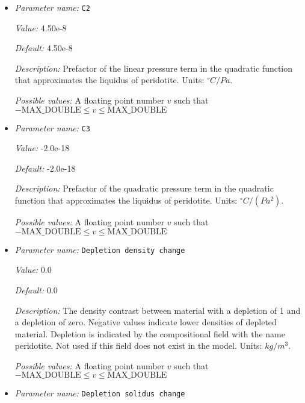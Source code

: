 \begin{itemize}
{\it Possible values:} A floating point number $v$ such that $-\text{MAX\_DOUBLE} \leq v \leq \text{MAX\_DOUBLE}$
\item {\it Parameter name:} {\tt C2}
\label{parameters:Material model/Melt simple/C2}
\label{parameters:Material_20model/Melt_20simple/C2}


{\it Value:} 4.50e-8


{\it Default:} 4.50e-8


{\it Description:} Prefactor of the linear pressure term in the quadratic function that approximates the liquidus of peridotite. Units: ${}^\circ C/Pa$.


{\it Possible values:} A floating point number $v$ such that $-\text{MAX\_DOUBLE} \leq v \leq \text{MAX\_DOUBLE}$
\item {\it Parameter name:} {\tt C3}
\label{parameters:Material model/Melt simple/C3}
\label{parameters:Material_20model/Melt_20simple/C3}


{\it Value:} -2.0e-18


{\it Default:} -2.0e-18


{\it Description:} Prefactor of the quadratic pressure term in the quadratic function that approximates the liquidus of peridotite. Units: ${}^\circ C/(Pa^2)$.


{\it Possible values:} A floating point number $v$ such that $-\text{MAX\_DOUBLE} \leq v \leq \text{MAX\_DOUBLE}$
\item {\it Parameter name:} {\tt Depletion density change}
\label{parameters:Material model/Melt simple/Depletion density change}
\label{parameters:Material_20model/Melt_20simple/Depletion_20density_20change}


{\it Value:} 0.0


{\it Default:} 0.0


{\it Description:} The density contrast between material with a depletion of 1 and a depletion of zero. Negative values indicate lower densities of depleted material. Depletion is indicated by the compositional field with the name peridotite. Not used if this field does not exist in the model. Units: $kg/m^3$.


{\it Possible values:} A floating point number $v$ such that $-\text{MAX\_DOUBLE} \leq v \leq \text{MAX\_DOUBLE}$
\item {\it Parameter name:} {\tt Depletion solidus change}
\label{parameters:Material model/Melt simple/Depletion solidus change}
\label{parameters:Material_20model/Melt_20simple/Depletion_20solidus_20change}



\end{itemize}
